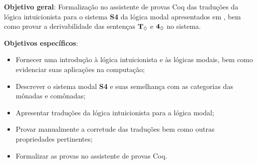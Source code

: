 \textbf{Objetivo geral}: Formalização no assistente de provas Coq das traduções da lógica intuicionista para o sistema \textbf{S4} da lógica modal apresentados em \cite{Troelstra}, bem como provar a derivabilidade das sentenças $\boldsymbol{\text{\textbf{T}}_\Diamond}$ e $\boldsymbol{\text{\textbf{4}}_\Diamond}$ no sistema.

\bigskip

\noindent
\textbf{Objetivos específicos}:
\begin{itemize}
    \item Fornecer uma introdução à lógica intuicionista e às lógicas modais, bem como evidenciar suas aplicações na computação;
    \item Descrever o sistema modal \textbf{S4} e suas semelhança com as categorias das mônadas e comônadas;
    \item Apresentar traduções da lógica intuicionista para a lógica modal;
    \item Provar manualmente a corretude das traduções bem como outras propriedades pertinentes;
    \item Formalizar as provas no assistente de provas Coq.
\end{itemize}